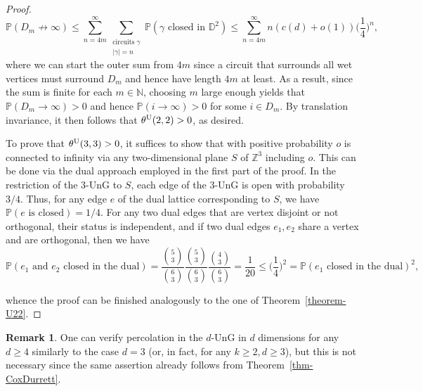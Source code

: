 \documentclass[oneside]{amsart}
\newcommand{\N}{\mathbb{N}}
\theoremstyle{definition}
\newtheorem{remark}[theorem]{Remark}
\renewcommand{\P}{\mathbb{P}}
\newcommand{\1}{\mathbbm{1}}
\newcommand{\0}{\mathbf{o}}
\newcommand{\Z}{\mathbb{Z}}
\newcommand*{\be}{\begin{equation}}
\newcommand*{\ee}{\end{equation}}
\newcommand{\D}{\mathbb D}
\newcommand{\basc}[1]{{\color{blue}{ \bf [~Bas:\ }\emph{#1}\textbf{~]}}}
\numberwithin{equation}{section}
\begin{document}
\begin{proof}
    \be 
    \P(D_m \not\to \infty )\leq \sum_{n=4m}^\infty \sum_{\substack{\text{circuits }\gamma \\ |\gamma|=n}}\P(\gamma\text{ closed in }\D^2)\leq \sum_{n=4m}^\infty n(c(d)+o(1))\Big(\frac14\Big)^n,
    \ee 
    where we can start the outer sum from $4m$ since a circuit that surrounds all wet vertices must surround $D_m$ and hence have length $4m$ at least. 
    As a result, since the sum is finite for each $m\in\N$, choosing $m$ large enough yields that $\P(D_m\to \infty)>0$ and hence $\P(i\to \infty)>0$ for some $i\in D_m$. By translation invariance, it then follows that $\theta^{\rm U}(2,2)>0$, as desired.

    To prove that $\theta^{\rm U}(3,3)>0$, it suffices to show that with positive probability $o$ is connected to infinity via any two-dimensional plane $S$ of $\Z^3$ including $o$. This can be done via the dual approach employed in the first part of the proof. In the restriction of the $3$-UnG to $S$, each edge of the $3$-UnG is open with probability $3/4$. Thus, for any edge $e$ of the dual lattice corresponding to $S$, we have $\P(e\text{ is closed})=1/4$. For any two dual edges that are vertex disjoint or not orthogonal, their status is independent, and if two dual edges $e_1,e_2$ share a vertex and are orthogonal, then we have
\[ \P(\text{$e_1$ and $e_2$ closed in the dual}) = \frac{\binom{5}{3}}{\binom{6}{3}} \frac{\binom{5}{3}}{\binom{6}{3}}\frac{\binom{4}{3}}{\binom{6}{3}} = \frac{1}{20}\leq \Big(\frac{1}{4}\Big)^2 = \P(e_1\text{ closed in the dual})^2, \]

whence the proof can be finished analogously to the one of Theorem~\ref{theorem-U22}.
\end{proof}

\begin{remark}
One can verify percolation in the $d$-UnG in $d$ dimensions for any $d \geq 4$ similarly to the case $d=3$ (or, in fact, for any $k\geq 2, d\geq 3$), but this is not necessary since the same assertion already follows from Theorem~\ref{thm-CoxDurrett}. 
\end{remark}
\end{document}
